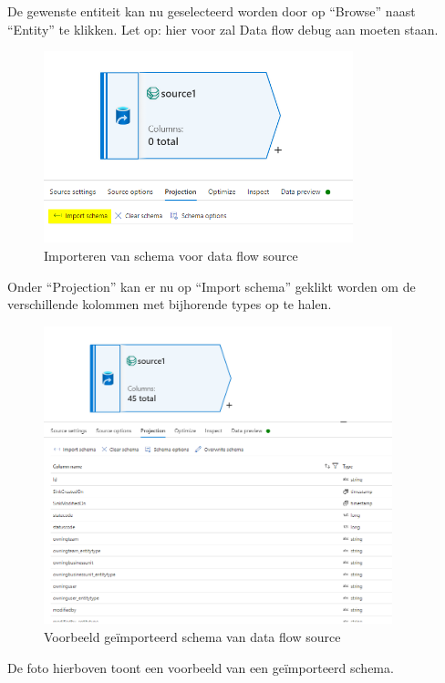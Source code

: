 De gewenste entiteit kan nu geselecteerd worden door op ``Browse'' naast ``Entity'' te klikken. Let op: hier voor zal Data flow debug aan moeten staan.

\begin{figure}[H]
    \centering
    \includegraphics[width=0.8\textwidth]{./graphics/adf/source_table_6_specific.png}
    \caption{Importeren van schema voor data flow source}
\end{figure}

Onder ``Projection'' kan er nu op ``Import schema'' geklikt worden om de verschillende kolommen met bijhorende types op te halen.

\begin{figure}[H]
    \centering
    \includegraphics[width=0.9\textwidth]{./graphics/adf/source_table_7_specific.png}
    \caption{Voorbeeld geïmporteerd schema van data flow source}
\end{figure}

De foto hierboven toont een voorbeeld van een geïmporteerd schema.

